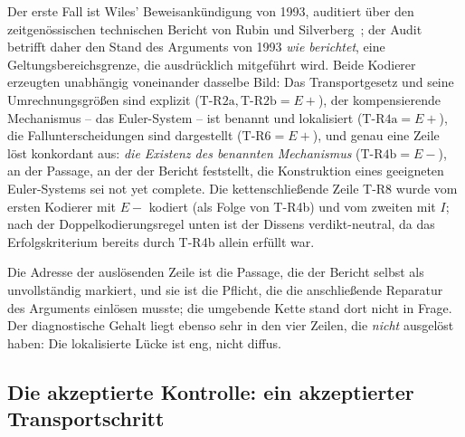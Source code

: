 \documentclass[11pt,a4paper]{article}
\begin{document}
Der erste Fall ist Wiles' Beweisankündigung von 1993, auditiert über den
zeitgenössischen technischen Bericht von Rubin und
Silverberg~\cite{rubinsilverberg}; der Audit betrifft daher den Stand des
Arguments von 1993 \emph{wie berichtet}, eine Geltungsbereichsgrenze, die
ausdrücklich mitgeführt wird. Beide Kodierer erzeugten unabhängig voneinander
dasselbe Bild: Das Transportgesetz und seine Umrechnungsgrößen sind explizit
($\text{T-R2a}, \text{T-R2b} = E{+}$), der kompensierende Mechanismus -- das
Euler-System -- ist benannt und lokalisiert ($\text{T-R4a} = E{+}$), die
Fallunterscheidungen sind dargestellt ($\text{T-R6} = E{+}$), und genau eine
Zeile löst konkordant aus: \emph{die Existenz des benannten Mechanismus}
($\text{T-R4b} = E{-}$), an der Passage, an der der Bericht feststellt, die
Konstruktion eines geeigneten Euler-Systems sei \glqq not yet complete\grqq{}. Die
kettenschließende Zeile T-R8 wurde vom ersten Kodierer mit $E{-}$ kodiert
(als Folge von T-R4b) und vom zweiten mit $I$; nach der Doppelkodierungsregel
unten ist der Dissens verdikt-neutral, da das Erfolgskriterium bereits durch
T-R4b allein erfüllt war.

Die Adresse der auslösenden Zeile ist die Passage, die der Bericht selbst als
unvollständig markiert, und sie ist die Pflicht, die die anschließende
Reparatur des Arguments einlösen musste; die umgebende Kette stand dort nicht
in Frage. Der diagnostische Gehalt liegt ebenso sehr in den vier Zeilen, die
\emph{nicht} ausgelöst haben: Die lokalisierte Lücke ist eng, nicht diffus.

\subsection{Die akzeptierte Kontrolle: ein akzeptierter Transportschritt}
\end{document}
